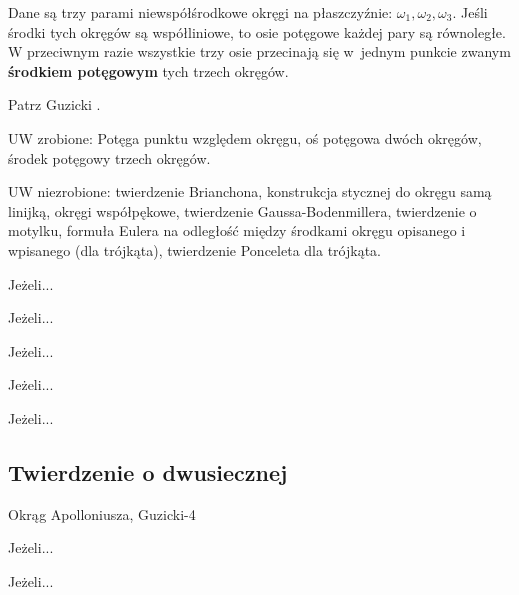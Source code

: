 \begin{corollary}
	Dane są trzy parami niewspółśrodkowe okręgi na płaszczyźnie: $\omega_1, \omega_2, \omega_3$.
	Jeśli środki tych okręgów są współliniowe, to osie potęgowe każdej pary są równoległe.
	W przeciwnym razie wszystkie trzy osie przecinają się w~jednym punkcie zwanym \textbf{środkiem potęgowym} tych trzech okręgów.
\end{corollary}

Patrz Guzicki \cite[s. 174]{guzicki_2021}.


UW zrobione:
Potęga punktu względem okręgu, oś potęgowa dwóch okręgów, środek potęgowy trzech okręgów.

UW niezrobione:
twierdzenie Brianchona, konstrukcja stycznej do okręgu samą linijką, okręgi współpękowe, twierdzenie Gaussa-Bodenmillera, twierdzenie o motylku, formuła Eulera na odległość między środkami okręgu opisanego i wpisanego (dla trójkąta), twierdzenie Ponceleta dla trójkąta.

\begin{definition}
	Jeżeli...
\end{definition}
\begin{proposition}
	Jeżeli...
\end{proposition}
\begin{definition}[oś potęgowa]
	Jeżeli...
\end{definition}
\begin{theorem}[Monge'a]
	Jeżeli...
\end{theorem}
\begin{theorem}[Auberta]
	Jeżeli...
\end{theorem}


\subsection{Twierdzenie o dwusiecznej}
Okrąg Apolloniusza, Guzicki-4

\begin{proposition}
	Jeżeli...
\end{proposition}



\begin{definition}
	Jeżeli...
\end{definition}


